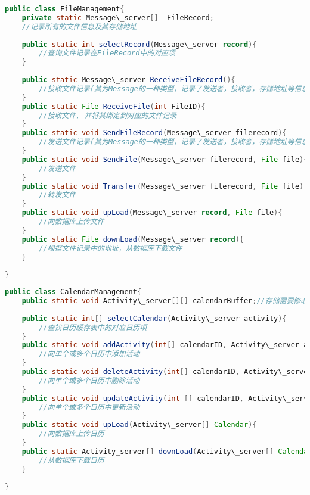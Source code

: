 \begin{lstlisting}[language=Java, caption=文件管理类]
public class FileManagement{
    private static Message\_server[]  FileRecord; 
    //记录所有的文件信息及其存储地址
    
    public static int selectRecord(Message\_server record){
        //查询文件记录在FileRecord中的对应项
    }
    
    public static Message\_server ReceiveFileRecord(){
        //接收文件记录(其为Message的一种类型，记录了发送者，接收者，存储地址等信息)
    }
    public static File ReceiveFile(int FileID){
        //接收文件, 并将其绑定到对应的文件记录
    }
    public static void SendFileRecord(Message\_server filerecord){
        //发送文件记录(其为Message的一种类型，记录了发送者，接收者，存储地址等信息)
    }
    public static void SendFile(Message\_server filerecord, File file){
        //发送文件
    }
    public static void Transfer(Message\_server filerecord, File file){
        //转发文件
    }
    public static void upLoad(Message\_server record, File file){
        //向数据库上传文件
    }
    public static File downLoad(Message\_server record){
        //根据文件记录中的地址，从数据库下载文件
    }
    
}
\end{lstlisting}

\begin{lstlisting}[language=Java, caption=日历管理类]
public class CalendarManagement{
    public static void Activity\_server[][] calendarBuffer;//存储需要修改的日历
    
    public static int[] selectCalendar(Activity\_server activity){
        //查找日历缓存表中的对应日历项
    }
    public static void addActivity(int[] calendarID, Activity\_server activity){
        //向单个或多个日历中添加活动
    }
    public static void deleteActivity(int[] calendarID, Activity\_server activity){
        //向单个或多个日历中删除活动
    }
    public static void updateActivity(int [] calendarID, Activity\_server activity){
        //向单个或多个日历中更新活动
    }
    public static void upLoad(Activity\_server[] Calendar){
        //向数据库上传日历
    }
    public static Activity_server[] downLoad(Activity\_server[] Calendar){
        //从数据库下载日历
    }
    
}
\end{lstlisting}

